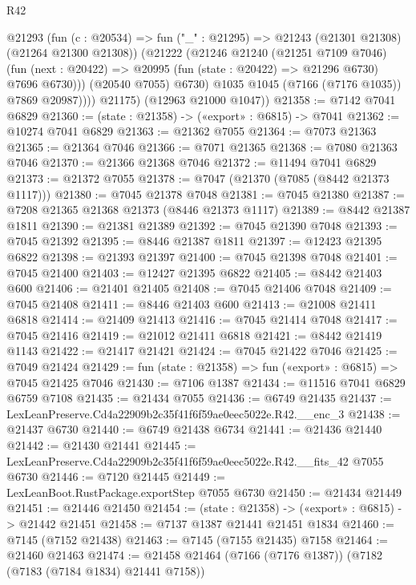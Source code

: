 \begin{lexlean}{R42}
\begin{coremodule}
{                @21293
                  (fun (c : @20534) =>
                  fun ("_" : @21295) => @21243 (@21301 @21308) (@21264 @21300 @21308))
                  (@21222
                    (@21246
                      @21240
                      (@21251 @7109 @7046)
                      (fun (next : @20422) =>
                      @20995 (fun (state : @20422) => @21296 @6730) @7696 @6730)))
                  (@20540 @7055)
                  @6730)
                @1035
                @1045
                (@7166 (@7176 @1035))
                @7869
                @20987))))
        @21175)
      (@12963 @21000 @1047))
@21358 := @7142 @7041 @6829
@21360 := (state : @21358) -> («export» : @6815) -> @7041
@21362 := @10274 @7041 @6829
@21363 := @21362 @7055
@21364 := @7073 @21363
@21365 := @21364 @7046
@21366 := @7071 @21365
@21368 := @7080 @21363 @7046
@21370 := @21366 @21368 @7046
@21372 := @11494 @7041 @6829
@21373 := @21372 @7055
@21378 := @7047 (@21370 (@7085 (@8442 @21373 @1117)))
@21380 := @7045 @21378 @7048
@21381 := @7045 @21380
@21387 := @7208 @21365 @21368 @21373 (@8446 @21373 @1117)
@21389 := @8442 @21387 @1811
@21390 := @21381 @21389
@21392 := @7045 @21390 @7048
@21393 := @7045 @21392
@21395 := @8446 @21387 @1811
@21397 := @12423 @21395 @6822
@21398 := @21393 @21397
@21400 := @7045 @21398 @7048
@21401 := @7045 @21400
@21403 := @12427 @21395 @6822
@21405 := @8442 @21403 @600
@21406 := @21401 @21405
@21408 := @7045 @21406 @7048
@21409 := @7045 @21408
@21411 := @8446 @21403 @600
@21413 := @21008 @21411 @6818
@21414 := @21409 @21413
@21416 := @7045 @21414 @7048
@21417 := @7045 @21416
@21419 := @21012 @21411 @6818
@21421 := @8442 @21419 @1143
@21422 := @21417 @21421
@21424 := @7045 @21422 @7046
@21425 := @7049 @21424
@21429 := fun (state : @21358) => fun («export» : @6815) => @7045 @21425 @7046
@21430 := @7106 @1387
@21434 := @11516 @7041 @6829 @6759 @7108
@21435 := @21434 @7055
@21436 := @6749 @21435
@21437 := LexLeanPreserve.Cd4a22909b2c35f41f6f59ae0eec5022e.R42.__enc_3
@21438 := @21437 @6730
@21440 := @6749 @21438 @6734
@21441 := @21436 @21440
@21442 := @21430 @21441
@21445 := LexLeanPreserve.Cd4a22909b2c35f41f6f59ae0eec5022e.R42.__fits_42 @7055 @6730
@21446 := @7120 @21445
@21449 := LexLeanBoot.RustPackage.exportStep @7055 @6730
@21450 := @21434 @21449
@21451 := @21446 @21450
@21454 := (state : @21358) -> («export» : @6815) -> @21442 @21451
@21458 := @7137 @1387 @21441 @21451 @1834
@21460 := @7145 (@7152 @21438)
@21463 := @7145 (@7155 @21435) @7158
@21464 := @21460 @21463
@21474 := @21458 @21464 (@7166 (@7176 @1387)) (@7182 (@7183 (@7184 @1834) @21441 @7158))
}
\end{coremodule}
\end{lexlean}

